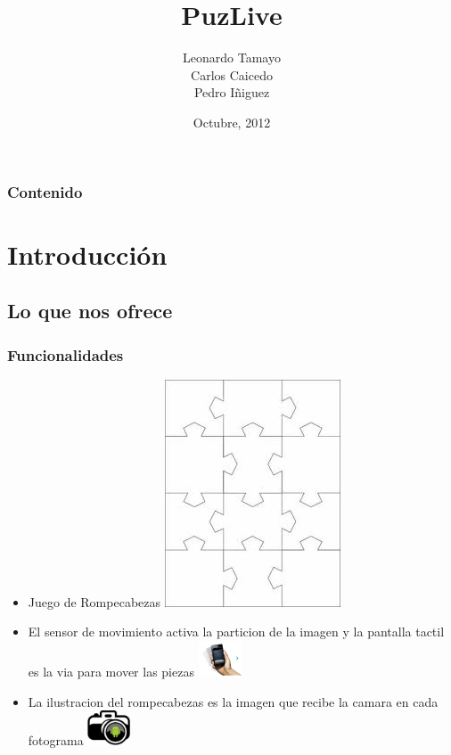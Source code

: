 \documentclass[serif,11pt]{beamer}
\begin{document}
	\title {PuzLive}  
	\author {Leonardo Tamayo\\ Carlos Caicedo \\ Pedro I\~niguez}
	\date[Octubre, 2012]{Octubre, 2012\\}
	

	\begin{frame}
		\titlepage
	\end{frame}

	\begin{frame}
		\frametitle{Contenido}\tableofcontents
	\end{frame} 


	\section{Introducci\'on} 

		\subsection{Lo que nos ofrece}

			\begin{frame}\frametitle{Funcionalidades}
				\pause
				\bigskip
				 
				\begin{itemize}
					 \bigskip
					\item Juego de Rompecabezas 
					\pause
					\includegraphics[height=0.1\textwidth]{rompeca} 
					\bigskip
					\pause
					
					\item El sensor de movimiento activa la particion de la imagen y la pantalla tactil es la via para mover las piezas 
					\pause
					\includegraphics[width=0.1\textwidth]{shake} 
					\bigskip
					\pause
					\item La ilustracion del rompecabezas es la imagen que recibe la camara en cada fotograma
					\bigskip
					\pause
					\includegraphics[width=0.1\textwidth]{camara1} 
					\bigskip

				\end{itemize}
			\end{frame}
\end{document}
